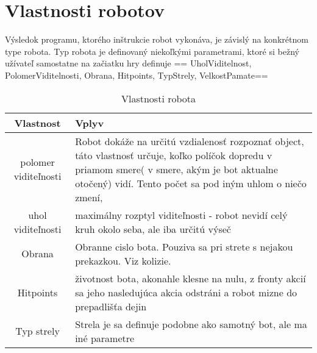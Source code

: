 \section{Vlastnosti robotov}
Výsledok programu, ktorého inštrukcie robot vykonáva, je závislý na konkrétnom type robota. Typ robota je definovaný niekoľkými parametrami, ktoré si bežný užívateľ samostatne na začiatku hry definuje == UholViditelnost, PolomerViditelnosti, Obrana, Hitpoints, TypStrely, VelkostPamate==\\
\begin{table}[ht]
\caption{Vlastnosti robota}   %
\centering                          %
\begin{tabular}{ | c | p{10cm} |}            %
\hline\hline                        %
Vlastnost & Vplyv \\   %
\hline                              %
polomer viditeľnosti & Robot dokáže na určitú vzdialenosť rozpoznať object, táto vlastnosť určuje, koľko políčok dopredu v priamom smere( v smere, akým je bot aktualne otočený) vidí. Tento počet sa pod iným uhlom o niečo zmení,\\\hline               %
uhol viditeľnosti & maximálny rozptyl viditeľnosti - robot nevidí celý kruh okolo seba, ale iba určitú výseč \\\hline
Obrana & Obranne cislo bota. Pouziva sa pri strete s nejakou prekazkou. Viz kolizie. \\\hline
Hitpoints  & životnost bota, akonahle klesne na nulu, z fronty akcií sa jeho nasledujúca akcia odstráni a robot mizne do prepadlišťa dejin\\\hline [1ex]         %
Typ strely & Strela je sa definuje podobne ako samotný bot, ale ma iné parametre\\\hline
\hline                              %
\end{tabular}
\label{table:vlastnosti}          %
\end{table}

